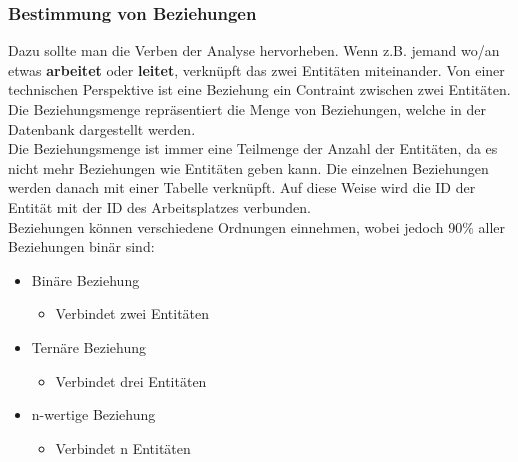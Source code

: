 \documentclass{article}
\begin{document}
	\subsubsection{Bestimmung von Beziehungen}
	Dazu sollte man die Verben der Analyse hervorheben. Wenn z.B. jemand wo/an etwas \textbf{arbeitet} oder \textbf{leitet}, verknüpft das zwei Entitäten miteinander. Von einer technischen Perspektive ist eine Beziehung ein Contraint zwischen zwei Entitäten. Die Beziehungsmenge repräsentiert die Menge von Beziehungen, welche in der Datenbank dargestellt werden. \\
	Die Beziehungsmenge ist immer eine Teilmenge der Anzahl der Entitäten, da es nicht mehr Beziehungen wie Entitäten geben kann. Die einzelnen Beziehungen werden danach mit einer Tabelle verknüpft. Auf diese Weise wird die ID der Entität mit der ID des Arbeitsplatzes verbunden. \\
	Beziehungen können verschiedene Ordnungen einnehmen, wobei jedoch 90\% aller Beziehungen binär sind:
	\begin{itemize}
		\item{Binäre Beziehung}
		\begin{itemize}
			\item{Verbindet zwei Entitäten}
		\end{itemize}
		\item{Ternäre Beziehung}
		\begin{itemize}
			\item{Verbindet drei Entitäten}
		\end{itemize}
		\item{n-wertige Beziehung}
		\begin{itemize}
			\item{Verbindet n Entitäten}
		\end{itemize}
	\end{itemize}
\end{document}
